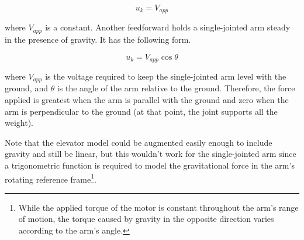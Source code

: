\begin{equation}
  u_k = V_{app}
\end{equation}

where $V_{app}$ is a constant. Another feedforward holds a single-jointed arm
steady in the presence of gravity. It has the following form.

\begin{equation}
  u_k = V_{app} \cos\theta
\end{equation}

where $V_{app}$ is the voltage required to keep the single-jointed arm level
with the ground, and $\theta$ is the angle of the arm relative to the ground.
Therefore, the force applied is greatest when the arm is parallel with the
ground and zero when the arm is perpendicular to the ground (at that point, the
joint supports all the weight).

Note that the elevator model could be augmented easily enough to include gravity
and still be linear, but this wouldn't work for the single-jointed arm since a
trigonometric function is required to model the gravitational force in the arm's
rotating reference frame\footnote{While the applied torque of the motor is
constant throughout the arm's range of motion, the torque caused by gravity in
the opposite direction varies according to the arm's angle.}.
